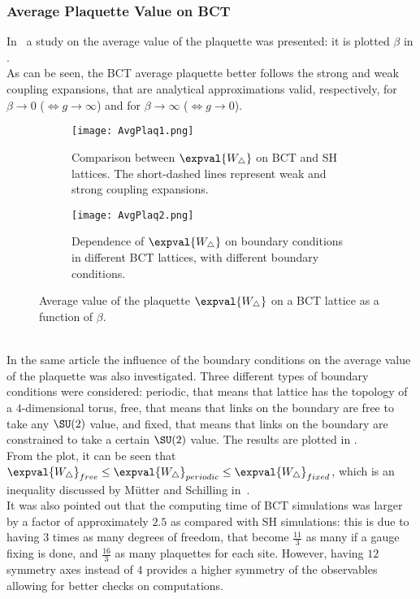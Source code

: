 \subsubsection{Average Plaquette Value on BCT}
In~\cite{Celmaster:1983vy} a study on the average value of the plaquette was presented: it is plotted \wrt $\beta$ in .\\
As can be seen, the BCT average plaquette better follows the strong and weak coupling expansions, that are analytical approximations valid, respectively, for $\beta\to0$ ($\Leftrightarrow g\to\infty$) and for $\beta\to\infty$ ($\Leftrightarrow g\to0$).
\begin{figure}[!htbp]
    \centering
    \begin{subfigure}[b]{0.475\textwidth}
        \texttt{[image: AvgPlaq1.png]}
        \caption{Comparison between $\expval{W_\bigtriangleup}$ on BCT and SH lattices. The short-dashed lines represent weak and strong coupling expansions.}
        \label{3F:AvgPlaqBCTSH}
    \end{subfigure}
    \hfill
    \begin{subfigure}[b]{0.475\textwidth}
        \texttt{[image: AvgPlaq2.png]}
        \caption{Dependence of $\expval{W_\bigtriangleup}$ on boundary conditions in different BCT lattices, with different boundary conditions.}
        \label{3F:AvgPlaqBoundary}
    \end{subfigure}
    \caption{Average value of the plaquette $\expval{W_\bigtriangleup}$ on a BCT lattice as a function of $\beta$.}
\end{figure}\\
In the same article the influence of the boundary conditions on the average value of the plaquette was also investigated.
Three different types of boundary conditions were considered: periodic, that means that lattice has the topology of a $4$-dimensional torus, free, that means that links on the boundary are free to take any $\SU(2)$ value, and fixed, that means that links on the boundary are constrained to take a certain $\SU(2)$ value.
The results are plotted in .\\
From the plot, it can be seen that $\expval{W_\bigtriangleup}_{free} \leq \expval{W_\bigtriangleup}_{periodic} \leq \expval{W_\bigtriangleup}_{fixed}$, which is an inequality discussed by Mütter and Schilling in~\cite{Konig:1983dg}.\\
It was also pointed out that the computing time of BCT simulations was larger by a factor of approximately $2.5$ as compared with SH simulations: this is due to having $3$ times as many degrees of freedom, that become $\frac{11}{3}$ as many if a gauge fixing is done, and $\frac{16}{3}$ as many plaquettes for each site.
However, having $12$ symmetry axes instead of $4$ provides a higher symmetry of the observables allowing for better checks on computations.


